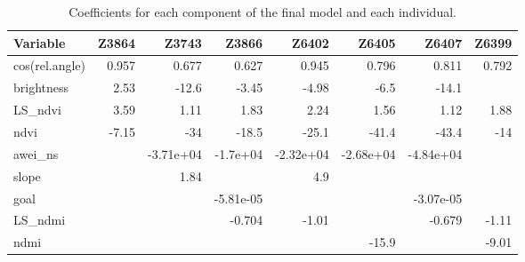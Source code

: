 \begin{table}[H]
\centering
\caption[Coefficients for each variable and each individual]{Coefficients for each component of the final model and each individual.} 
\label{table:summary_coef_BWA}
\begin{tabular}{lrrrrrrr}
  \hline
Variable & Z3864 & Z3743 & Z3866 & Z6402 & Z6405 & Z6407 & Z6399 \\ 
  \hline
cos(rel.angle) & 0.957 & 0.677 & 0.627 & 0.945 & 0.796 & 0.811 & 0.792 \\ 
  brightness & 2.53 & -12.6 & -3.45 & -4.98 & -6.5 & -14.1 &  \\ 
  LS\_ndvi & 3.59 & 1.11 & 1.83 & 2.24 & 1.56 & 1.12 & 1.88 \\ 
  ndvi & -7.15 &  -34 & -18.5 & -25.1 & -41.4 & -43.4 &  -14 \\ 
  awei\_ns &  & -3.71e+04 & -1.7e+04 & -2.32e+04 & -2.68e+04 & -4.84e+04 &  \\ 
  slope &  & 1.84 &  &  4.9 &  &  &  \\ 
  goal &  &  & -5.81e-05 &  &  & -3.07e-05 &  \\ 
  LS\_ndmi &  &  & -0.704 & -1.01 &  & -0.679 & -1.11 \\ 
  ndmi &  &  &  &  & -15.9 &  & -9.01 \\ 
   \hline
\end{tabular}
\end{table}
